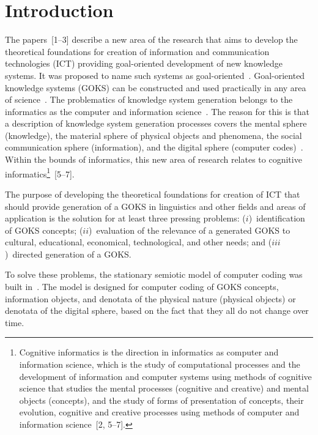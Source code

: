       \begin{multicols}{2}

      \label{st\stat}

\section{Introduction}

\noindent
The papers~[1--3] describe a new area of the research that aims to develop the theoretical 
foundations for creation of information and communication \mbox{technologies} (ICT) providing 
   goal-oriented development of new knowledge systems. It was proposed to name such 
systems as goal-oriented~\cite{3bun, 1bun}. Goal-oriented knowledge systems (GOKS) can be 
constructed and used practically in any area of science~\cite{2bun}. The problematics of 
\mbox{knowledge} system generation belongs to the informatics as the \mbox{computer} and information 
science~\cite{4bun}. The reason for this is that a description of knowledge system \mbox{generation} 
processes covers the mental sphere (knowledge), the material sphere of physical objects and 
phenomena, the social communication sphere (information), and the digital sphere (computer 
codes)~\cite{3bun, 1bun}. Within the bounds of informatics, this new area of research relates to 
cognitive informatics\footnote[5]{Cognitive informatics is the direction in informatics as computer and 
information science, which is the study of computational processes and the development of information and 
computer systems using methods of cognitive science that studies the mental processes (cognitive and creative) and 
mental objects (concepts), and the study of forms of presentation of concepts, their evolution, cognitive and creative 
processes using methods of computer and information science~[2, 5--7].}~[5--7].
   
   The purpose of developing the theoretical foundations for creation of ICT that should provide 
\mbox{generation} of a GOKS in linguistics and other fields and \mbox{areas} 
of application is the solution for at least three \mbox{pressing} \mbox{problems}: ($i$)~identification of GOKS 
concepts; ($ii$)~evaluation of the relevance of a generated GOKS to cultural, educational, 
economical, technological, and other needs; and ($iii$)~directed generation of a GOKS.
   
   To solve these problems, the stationary semiotic model of computer coding was built 
in~\cite{3bun}. 
The model is designed for computer coding of GOKS concepts, information 
objects, and denotata of the physical nature (physical objects) or denotata of the digital sphere, 
based on the fact that they all do not change over time.
   

\end{multicols}
